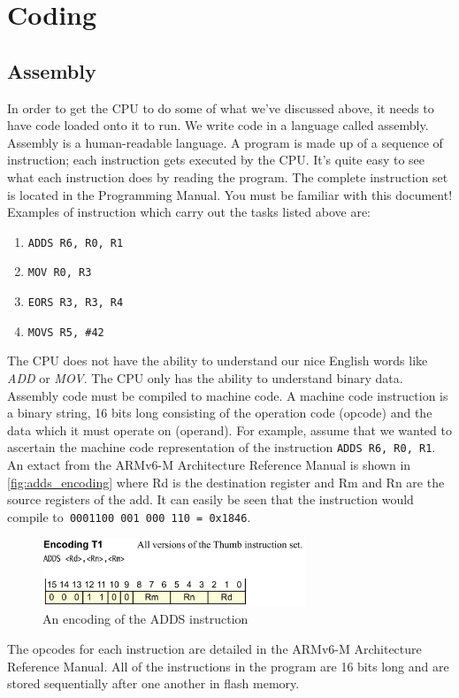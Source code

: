 \chapter{Coding}

\section{Assembly}

In order to get the CPU to do some of what we've discussed above, it needs to have code loaded onto it to run. We write code in a language called assembly. Assembly is a human-readable language. A program is made up of a sequence of instruction; each instruction gets executed by the CPU. It's quite easy to see what each instruction does by reading the program.  The complete instruction set is located in the Programming Manual. You must be familiar with this document! Examples of instruction which carry out the tasks listed above are:
\begin{enumerate}
  \item \texttt{ADDS R6, R0, R1}
  \item \texttt{MOV R0, R3}
  \item \texttt{EORS R3, R3, R4}
  \item \texttt{MOVS R5, \#42}
\end{enumerate}
The CPU does not have the ability to understand our nice English words like \textit{ADD} or \textit{MOV}. The CPU only has the ability to understand binary data. Assembly code must be compiled to machine code. A machine code instruction is a binary string, 16 bits long consisting of the operation code (opcode) and the data which it must operate on (operand).
For example, assume that we wanted to ascertain the machine code representation of the instruction \texttt{ADDS R6, R0, R1}. An extact from the ARMv6-M Architecture Reference Manual is shown in \autoref{fig:adds_encoding} where Rd is the destination register and Rm and Rn are the source registers of the add. It can easily be seen that the instruction would compile to\texttt{ 0001100 001 000 110 = 0x1846}.
\begin{figure}
\centering
\includegraphics[width=0.7\textwidth]{./week1/adds_encoding}
\caption{An encoding of the ADDS instruction}
\label{fig:adds_encoding}
\end{figure}
The opcodes for each instruction are detailed in the ARMv6-M Architecture Reference Manual.
All of the instructions in the program are 16 bits long and are stored sequentially after one another in flash memory. 



